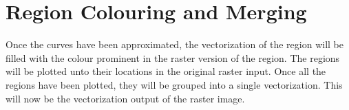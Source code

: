 \section{Region Colouring and Merging}
Once the curves have been approximated, the vectorization of the region will be filled with the colour prominent in the raster version of the region. The regions will be plotted unto their locations in the original raster input. Once all the regions have been plotted, they will be grouped into a single vectorization. This will now be the vectorization output of the raster image.
 


